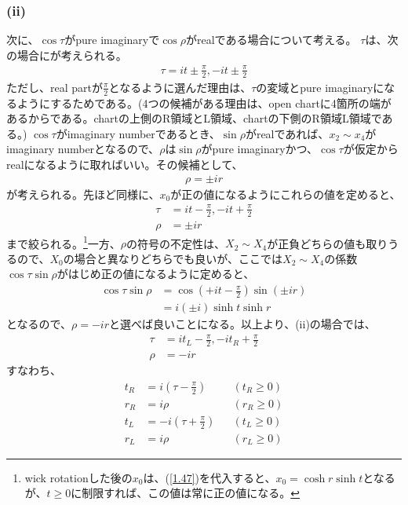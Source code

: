 \subsubsection{(ii)}
次に、$\cos\tau$がpure imaginaryで$\cos\rho$がrealである場合について考える。
$\tau$は、次の場合にが考えられる。
\begin{align}
  \tau=it\pm\frac{\pi}{2},-it\pm\frac{\pi}{2}
\end{align}
ただし、real partが$\frac{\pi}{2}$となるように選んだ理由は、$\tau$の変域とpure imaginaryになるようにするためである。(4つの候補がある理由は、open chartに4箇所の端があるからである。chartの上側のR領域とL領域、chartの下側のR領域L領域である。) $\cos\tau$がimaginary numberであるとき、$\sin\rho$がrealであれば、$x_2 \sim x_4$がimaginary numberとなるので、$\rho$は$\sin\rho$がpure imaginaryかつ、$\cos\tau$が仮定からrealになるように取ればいい。その候補として、
\begin{align}
  \rho=\pm ir
\end{align}
が考えられる。先ほど同様に、$x_0$が正の値になるようにこれらの値を定めると、
\begin{align}
  \label{1.47}
  \tau&=it-\frac{\pi}{2},-it+\frac{\pi}{2} \\
  \label{1.48}
  \rho &= \pm ir
\end{align}
まで絞られる。\footnote{wick rotationした後の$x_0$は、(\ref{1.47})を代入すると、$x_0=\cosh{r}\sinh{t}$となるが、$t \geqslant 0$に制限すれば、この値は常に正の値になる。}一方、$\rho$の符号の不定性は、$X_2\sim X_4$が正負どちらの値も取りうるので、$X_0$の場合と異なりどちらでも良いが、ここでは$X_2\sim X_4$の係数$\cos\tau\sin\rho$がはじめ正の値になるように定めると、
\begin{align}
  \cos\tau\sin\rho&=\cos(+it-\frac{\pi}{2})\sin(\pm ir) \\
  &=i(\pm i)\sinh{t}\sinh{r}
\end{align}
となるので、$\rho=-ir$と選べば良いことになる。以上より、(ii)の場合では、
\begin{align}
  \label{1.49}
  \tau&=it_{L}-\frac{\pi}{2},-it_{R}+\frac{\pi}{2} \\
  \label{1.59}
  \rho&=-ir
\end{align}
すなわち、
\begin{align}
  \label{relttt}
  t_{R}&=i(\tau-\frac{\pi}{2})& &(t_{R} \geqslant 0) \\
  r_{R}&=i\rho& &(r_{R} \geqslant 0) \\
  t_{L}&=-i(\tau+\frac{\pi}{2})& &(t_{L} \geqslant 0) \\
  r_{L}&=i\rho& &(r_{L} \geqslant 0)
\end{align}

